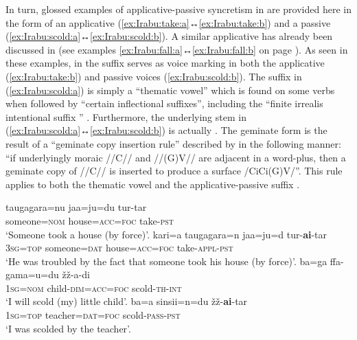 In turn, glossed examples of applicative-passive syncretism in  are provided here in the form of an applicative  (\ref{ex:Irabu:take:a}↔\ref{ex:Irabu:take:b}) and a passive  (\ref{ex:Irabu:scold:a}↔\ref{ex:Irabu:scold:b}). A similar applicative  has already been discussed in  (see examples \ref{ex:Irabu:fall:a}↔\ref{ex:Irabu:fall:b} on page \pageref{ex:Irabu:fall:a}). As seen in these examples, in  the suffix  serves as voice marking in both the applicative (\ref{ex:Irabu:take:b}) and passive voices (\ref{ex:Irabu:scold:b}). The suffix  in (\ref{ex:Irabu:scold:a}) is simply a “thematic vowel” which is found on some verbs when followed by “certain inflectional suffixes”, including the “finite irrealis intentional suffix ” \citep[260f.]{shimoji:2008}. Furthermore, the underlying stem in (\ref{ex:Irabu:scold:a}↔\ref{ex:Irabu:scold:b}) is actually . The geminate form  is the result of a “geminate copy insertion rule” described by \cite[69]{shimoji:2008} in the following manner: “if underlyingly moraic //C// and //(G)V// are adjacent in a word-plus, then a geminate copy of //C// is inserted to produce a surface /CiCi(G)V/”. This rule applies to both the thematic vowel  and the applicative-passive suffix  \citep[70, 297]{shimoji:2008}. 

\ea {} \citep[193, 297, 496]{shimoji:2008}
\ea\label{ex:Irabu:take:a}
	\gll	taugagara=nu jaa=ju=du tur-tar \\
			someone=\textsc{nom} house=\textsc{acc=foc} take-\textsc{pst} \\
	\glt	‘Someone took a house (by force)’.
\ex\label{ex:Irabu:take:b}
	\gll	kari=a taugagara=n jaa=ju=d tur-\textbf{ai}-tar \\
			\textsc{3sg=top} someone=\textsc{dat} house=\textsc{acc=foc} take-\textsc{appl-pst} \\
	\glt	‘He was troubled by the fact that someone took his house (by force)’.
\ex\label{ex:Irabu:scold:a}
	\gll	ba=ga ffa-gama=u=du žž-a-di \\
			\textsc{1sg=nom} child-\textsc{dim=acc=foc} scold-\textsc{th-int} \\
	\glt	‘I will scold (my) little child’.
\ex\label{ex:Irabu:scold:b}
	\gll	ba=a sinsii=n=du žž-\textbf{ai}-tar \\
			\textsc{1sg=top} teacher=\textsc{dat=foc} scold-\textsc{pass-pst} \\
	\glt	‘I was scolded by the teacher’.
	\z 
\z

